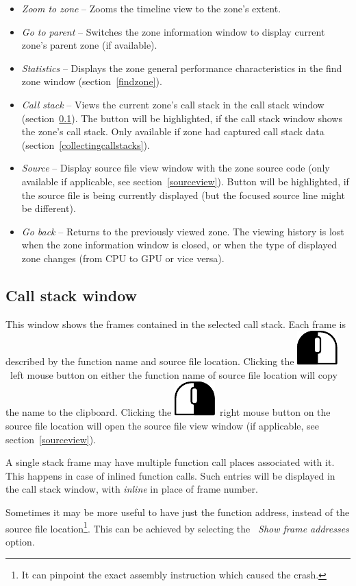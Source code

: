 \documentclass[hidelinks,titlepage,a4paper]{article}
\newcommand{\LMB}{\includegraphics[height=.8\baselineskip]{icons/lmb}}
\newcommand{\RMB}{\includegraphics[height=.8\baselineskip]{icons/rmb}}
\begin{document}
\begin{itemize}
\item \emph{\faMicroscope{} Zoom to zone} -- Zooms the timeline view to the zone's extent.
\item \emph{\faArrowUp{} Go to parent} -- Switches the zone information window to display current zone's parent zone (if available).
\item \emph{\faChartBar{} Statistics} -- Displays the zone general performance characteristics in the find zone window (section~\ref{findzone}).
\item \emph{\faAlignJustify{} Call stack} -- Views the current zone's call stack in the call stack window (section~\ref{callstackwindow}). The button will be highlighted, if the call stack window shows the zone's call stack. Only available if zone had captured call stack data (section~\ref{collectingcallstacks}).
\item \emph{\faFile*{} Source} -- Display source file view window with the zone source code (only available if applicable, see section~\ref{sourceview}). Button will be highlighted, if the source file is being currently displayed (but the focused source line might be different).
\item \emph{\faArrowLeft{} Go back} -- Returns to the previously viewed zone. The viewing history is lost when the zone information window is closed, or when the type of displayed zone changes (from CPU to GPU or vice versa).
\end{itemize}

\subsection{Call stack window}
\label{callstackwindow}

This window shows the frames contained in the selected call stack. Each frame is described by the function name and source file location. Clicking the \LMB{}~left mouse button on either the function name of source file location will copy the name to the clipboard. Clicking the \RMB{}~right mouse button on the source file location will open the source file view window (if applicable, see section~\ref{sourceview}).

A single stack frame may have multiple function call places associated with it. This happens in case of inlined function calls. Such entries will be displayed in the call stack window, with \emph{inline} in place of frame number.

Sometimes it may be more useful to have just the function address, instead of the source file location\footnote{It can pinpoint the exact assembly instruction which caused the crash.}. This can be achieved by selecting the \emph{\faAt{}~Show frame addresses} option.
\end{document}
